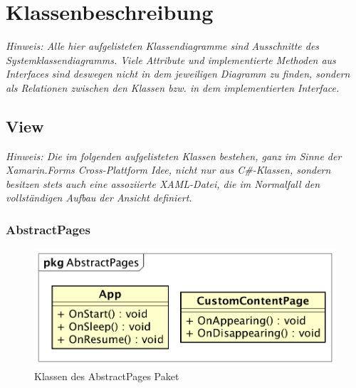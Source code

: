 \documentclass[a4paper]{scrreprt}
\begin{document}
\chapter{Klassenbeschreibung}
\textit{Hinweis: Alle hier aufgelisteten Klassendiagramme sind Ausschnitte des Systemklassendiagramms. Viele Attribute und implementierte Methoden aus Interfaces sind deswegen nicht in dem jeweiligen Diagramm zu finden, sondern als Relationen zwischen den Klassen bzw. in dem implementierten Interface.}
 
\section{View}
\textit{Hinweis: Die im folgenden aufgelisteten Klassen bestehen, ganz im Sinne der Xamarin.Forms Cross-Plattform Idee, nicht nur aus C\#-Klassen, sondern besitzen stets auch eine assoziierte XAML-Datei, die im Normalfall den vollständigen Aufbau der Ansicht definiert.}

\subsection{AbstractPages}
\begin{figure}[H]
\centering
\includegraphics[width=0.75\textheight]{graphics/Klassendiagramme/View/AbstractPages.png}
\caption{Klassen des AbstractPages Paket}
\end{figure}
\end{document}
